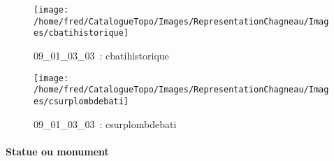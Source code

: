 \documentclass[12pt,titlepage]{book}
\begin{document}
\begin{figure}[h!]
\begin{minipage}[t]{3cm}
    \begin{center}
      \texttt{[image: /home/fred/CatalogueTopo/Images/RepresentationChagneau/Images/cbatihistorique]}
      \caption[~09\_01\_03\_03]{\small{09\_01\_03\_03~:} \tiny{cbatihistorique}}\label{cbatihistorique}
    \end{center}
  \end{minipage}
  \begin{minipage}[t]{3cm}
    \begin{center}
      \texttt{[image: /home/fred/CatalogueTopo/Images/RepresentationChagneau/Images/csurplombdebati]}
      \caption[~09\_01\_03\_03]{\small{09\_01\_03\_03~:} \tiny{csurplombdebati}}\label{csurplombdebati}
    \end{center}
  \end{minipage}
\end{figure}


\paragraph{Statue ou monument}
\noindent
\vspace{\baselineskip}
\end{document}
